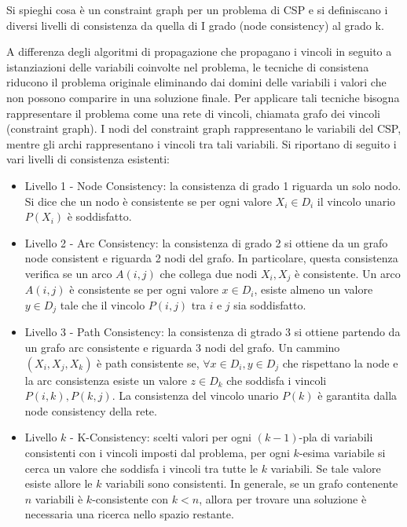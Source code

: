 \documentclass[answers, a4paper, 11pt]{exam}
\begin{document}
\begin{questions}
\question Si spieghi cosa è un constraint graph per un problema di CSP e si definiscano i diversi livelli di
consistenza da quella di I grado (node consistency) al grado k.
\begin{solution}
  A differenza degli algoritmi di propagazione che propagano i vincoli in seguito a istanziazioni delle variabili coinvolte nel problema, le tecniche di consistena riducono il problema originale eliminando dai domini delle variabili i valori che non possono comparire in una soluzione finale.
  Per applicare tali tecniche bisogna rappresentare il problema come una rete di vincoli, chiamata grafo dei vincoli (constraint graph). I nodi del constraint graph rappresentano le variabili del CSP, mentre gli archi rappresentano i vincoli tra tali variabili.
  Si riportano di seguito i vari livelli di consistenza esistenti:
  \begin{itemize}

    \item Livello 1 - Node Consistency: la consistenza di grado 1 riguarda un solo nodo. Si dice che un nodo è consistente se per ogni valore $X_i \in D_i$  il vincolo unario $P(X_i)$ è soddisfatto.

    \item Livello 2 - Arc Consistency: la consistenza di grado 2 si ottiene da un grafo node consistent e riguarda 2 nodi del grafo. In particolare, questa consistenza verifica se un arco $A(i, j)$ che collega due nodi $X_i, X_j$ è consistente.
  Un arco $A(i, j)$ è consistente se per ogni valore $x \in D_i$, esiste almeno un valore $y \in D_j$ tale che il vincolo $P(i, j)$ tra $i$ e $j$ sia soddisfatto.

   \item Livello 3 - Path Consistency: la consistenza di gtrado 3 si ottiene partendo da un grafo arc consistente e riguarda 3 nodi del grafo. Un cammino $(X_i, X_j, X_k)$ è path consistente se, $\forall x \in D_i, y \in D_j$ che rispettano la node e la arc consistenza esiste un valore $z \in D_k$ che soddisfa i vincoli $P(i, k), P(k, j)$.
  La consistenza del vincolo unario $P(k)$ è garantita dalla node consistency della rete.

\item Livello $k$ - K-Consistency: scelti valori per ogni $(k-1)$-pla di variabili consistenti con i vincoli imposti dal problema, per ogni $k$-esima variabile si cerca un valore che soddisfa i vincoli tra tutte le $k$ variabili. Se tale valore esiste allore le $k$ variabili sono consistenti. In generale, se un grafo contenente $n$ variabili è $k$-consistente con $k < n$, allora per trovare una soluzione è necessaria una ricerca nello spazio restante.
  \end{itemize}
\end{solution}


\end{questions}
\end{document}
